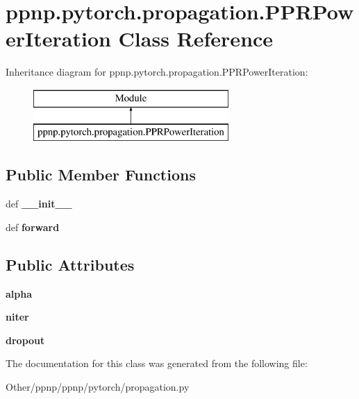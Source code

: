 \hypertarget{classppnp_1_1pytorch_1_1propagation_1_1PPRPowerIteration}{}\section{ppnp.\+pytorch.\+propagation.\+P\+P\+R\+Power\+Iteration Class Reference}
\label{classppnp_1_1pytorch_1_1propagation_1_1PPRPowerIteration}
Inheritance diagram for ppnp.\+pytorch.\+propagation.\+P\+P\+R\+Power\+Iteration\+:\begin{figure}[H]
\begin{center}
\leavevmode
\includegraphics[height=2.000000cm]{classppnp_1_1pytorch_1_1propagation_1_1PPRPowerIteration}
\end{center}
\end{figure}
\subsection*{Public Member Functions}
\begin{DoxyCompactItemize}
\item 
\mbox{\label{classppnp_1_1pytorch_1_1propagation_1_1PPRPowerIteration_a8561b985d0a207e64b92b8621d774b8e}} 
def {\bfseries \+\_\+\+\_\+init\+\_\+\+\_\+}
\item 
\mbox{\label{classppnp_1_1pytorch_1_1propagation_1_1PPRPowerIteration_ad22c7be4fc0267cbfca04be198d3c863}} 
def {\bfseries forward}
\end{DoxyCompactItemize}
\subsection*{Public Attributes}
\begin{DoxyCompactItemize}
\item 
\mbox{\label{classppnp_1_1pytorch_1_1propagation_1_1PPRPowerIteration_ae5b56ecc5c3cf26fa2562ec29b86c61e}} 
{\bfseries alpha}
\item 
\mbox{\label{classppnp_1_1pytorch_1_1propagation_1_1PPRPowerIteration_ad64d212754943a07ae70ebc17af07d3c}} 
{\bfseries niter}
\item 
\mbox{\label{classppnp_1_1pytorch_1_1propagation_1_1PPRPowerIteration_a48a2bd367d0d5251ec72a9a7d3e36c78}} 
{\bfseries dropout}
\end{DoxyCompactItemize}


The documentation for this class was generated from the following file\+:\begin{DoxyCompactItemize}
\item 
Other/ppnp/ppnp/pytorch/propagation.\+py\end{DoxyCompactItemize}
